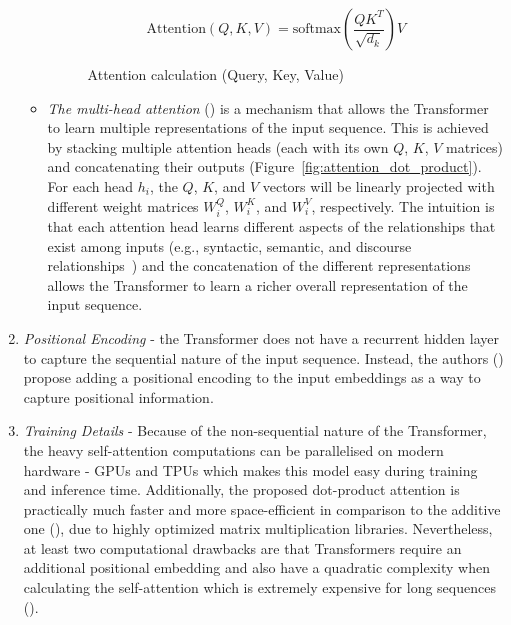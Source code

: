 \begin{enumerate}
\begin{itemize}
        \begin{figure}
            \begin{equation}
                \text{Attention}(Q, K, V) = \text{softmax}\left(\frac{QK^T}{\sqrt{d_k}}\right)V\label{eq:equation2}
            \end{equation}
            \caption{Attention calculation (Query, Key, Value)}
            \label{fig:attention}
        \end{figure}

        \item \emph{The multi-head attention} (\cite{vaswani2017attention}) is a mechanism that allows the Transformer to learn multiple representations of the input sequence.
        This is achieved by stacking multiple attention heads (each with its own $Q$, $K$, $V$ matrices) and concatenating their outputs (Figure~\ref{fig:attention_dot_product}).
        For each head $h_i$, the $Q$, $K$, and $V$ vectors will be linearly projected with different weight matrices $W_i^Q$, $W_i^K$, and $W_i^V$, respectively.
        The intuition is that each attention head learns different aspects of the relationships that exist among inputs (e.g., syntactic, semantic, and discourse relationships~\cite{jurafsky2000}) and the concatenation of the different representations allows the Transformer to learn a richer overall representation of the input sequence.

    \end{itemize}
    \item \emph{Positional Encoding} - the Transformer does not have a recurrent hidden layer to capture the sequential nature of the input sequence.
    Instead, the authors (\cite{vaswani2017attention}) propose adding a positional encoding to the input embeddings as a way to capture positional information.
    \item \emph{Training Details} - Because of the non-sequential nature of the Transformer, the heavy self-attention computations can be parallelised on modern hardware - GPUs and TPUs which makes this model easy during training and inference time.
    Additionally, the proposed dot-product attention is practically much faster and more space-efficient in comparison to the additive one (\cite{bahdanau2016neural}), due to highly optimized matrix multiplication libraries.
    Nevertheless, at least two computational drawbacks are that Transformers require an additional positional embedding and also have a quadratic complexity when calculating the self-attention which is extremely expensive for long sequences (\cite{jurafsky2000}).
\end{enumerate}

